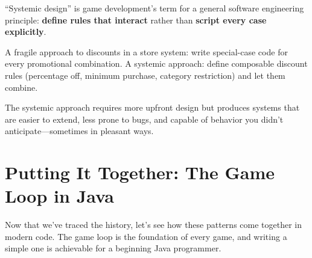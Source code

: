 \documentclass[11pt,letterpaper]{article}
\begin{document}
\begin{tipbox}
``Systemic design'' is game development's term for a general software engineering principle: \textbf{define rules that interact} rather than \textbf{script every case explicitly}.

A fragile approach to discounts in a store system: write special-case code for every promotional combination. A systemic approach: define composable discount rules (percentage off, minimum purchase, category restriction) and let them combine.

The systemic approach requires more upfront design but produces systems that are easier to extend, less prone to bugs, and capable of behavior you didn't anticipate---sometimes in pleasant ways.
\end{tipbox}

\section{Putting It Together: The Game Loop in Java}

Now that we've traced the history, let's see how these patterns come together in modern code. The game loop is the foundation of every game, and writing a simple one is achievable for a beginning Java programmer.
\end{document}
